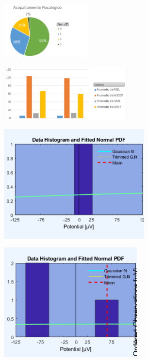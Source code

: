 \begin{center}
\includegraphics[height=1.15in]{figuras/Imagen18.png}
\end{center}

\begin{center}
\includegraphics[height=1.15in]{figuras/Imagen19.png}
\end{center}



\begin{center}
\includegraphics[height=2.35in]{figuras/Imagen7.png}
\end{center}

\begin{center}
\includegraphics[height=2.35in]{figuras/Imagen8.png}
\end{center}

